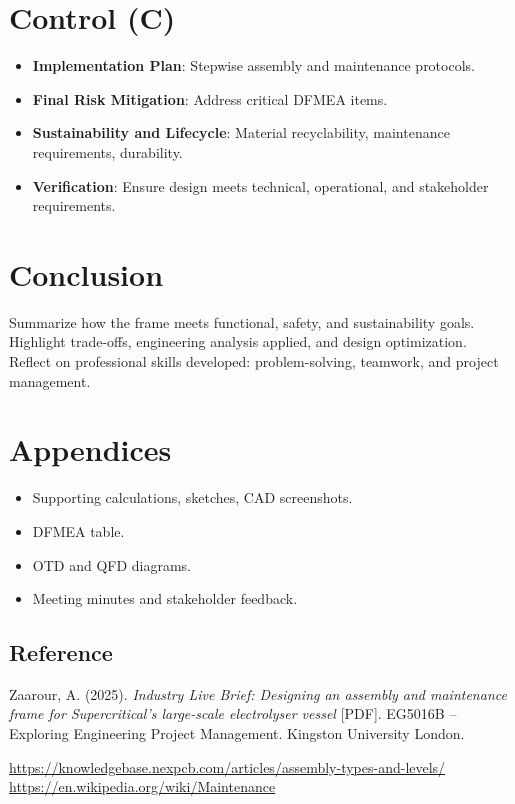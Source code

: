 \documentclass[9pt]{extarticle}
\begin{document}
\newpage

\section{Control (C)}
\color{red!50!black}
\begin{itemize}[itemsep=-1mm]
	\item \textbf{Implementation Plan}: Stepwise assembly and maintenance protocols.
	\item \textbf{Final Risk Mitigation}: Address critical DFMEA items.
	\item \textbf{Sustainability and Lifecycle}: Material recyclability, maintenance requirements, durability.
	\item \textbf{Verification}: Ensure design meets technical, operational, and stakeholder requirements.
\end{itemize}
\color{black}

\newpage

\section{Conclusion}
\color{red!50!black}
Summarize how the frame meets functional, safety, and sustainability goals. Highlight trade-offs, engineering analysis applied, and design optimization. Reflect on professional skills developed: problem-solving, teamwork, and project management.
\color{black}

\newpage

\section{Appendices}
\color{red!50!black}
\begin{itemize}[itemsep=-1mm]
	\item Supporting calculations, sketches, CAD screenshots.
	\item DFMEA table.
	\item OTD and QFD diagrams.
	\item Meeting minutes and stakeholder feedback.
\end{itemize}
\color{black}


\newpage

\subsection*{Reference}
Zaarour, A. (2025). \textit{Industry Live Brief: Designing an assembly and maintenance frame for Supercritical's large-scale electrolyser vessel} [PDF]. EG5016B – Exploring Engineering Project Management. Kingston University London.

\url{https://knowledgebase.nexpcb.com/articles/assembly-types-and-levels/}
\url{https://en.wikipedia.org/wiki/Maintenance}
\end{document}
